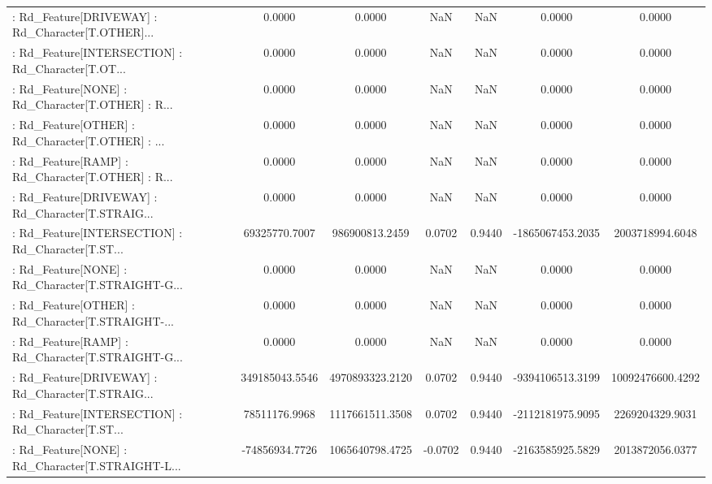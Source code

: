 \begin{longtable}{p{4cm}cccccc}
 : Rd\_Feature[DRIVEWAY] : Rd\_Character[T.OTHER]... &            0.0000 &            0.0000 &     NaN &          NaN &             0.0000 &            0.0000 \\
 : Rd\_Feature[INTERSECTION] : Rd\_Character[T.OT... &            0.0000 &            0.0000 &     NaN &          NaN &             0.0000 &            0.0000 \\
 : Rd\_Feature[NONE] : Rd\_Character[T.OTHER] : R... &            0.0000 &            0.0000 &     NaN &          NaN &             0.0000 &            0.0000 \\
 : Rd\_Feature[OTHER] : Rd\_Character[T.OTHER] : ... &            0.0000 &            0.0000 &     NaN &          NaN &             0.0000 &            0.0000 \\
 : Rd\_Feature[RAMP] : Rd\_Character[T.OTHER] : R... &            0.0000 &            0.0000 &     NaN &          NaN &             0.0000 &            0.0000 \\
 : Rd\_Feature[DRIVEWAY] : Rd\_Character[T.STRAIG... &            0.0000 &            0.0000 &     NaN &          NaN &             0.0000 &            0.0000 \\
 : Rd\_Feature[INTERSECTION] : Rd\_Character[T.ST... &     69325770.7007 &    986900813.2459 &  0.0702 &       0.9440 &   -1865067453.2035 &   2003718994.6048 \\
 : Rd\_Feature[NONE] : Rd\_Character[T.STRAIGHT-G... &            0.0000 &            0.0000 &     NaN &          NaN &             0.0000 &            0.0000 \\
 : Rd\_Feature[OTHER] : Rd\_Character[T.STRAIGHT-... &            0.0000 &            0.0000 &     NaN &          NaN &             0.0000 &            0.0000 \\
 : Rd\_Feature[RAMP] : Rd\_Character[T.STRAIGHT-G... &            0.0000 &            0.0000 &     NaN &          NaN &             0.0000 &            0.0000 \\
 : Rd\_Feature[DRIVEWAY] : Rd\_Character[T.STRAIG... &    349185043.5546 &   4970893323.2120 &  0.0702 &       0.9440 &   -9394106513.3199 &  10092476600.4292 \\
 : Rd\_Feature[INTERSECTION] : Rd\_Character[T.ST... &     78511176.9968 &   1117661511.3508 &  0.0702 &       0.9440 &   -2112181975.9095 &   2269204329.9031 \\
 : Rd\_Feature[NONE] : Rd\_Character[T.STRAIGHT-L... &    -74856934.7726 &   1065640798.4725 & -0.0702 &       0.9440 &   -2163585925.5829 &   2013872056.0377 \\

\end{longtable}
